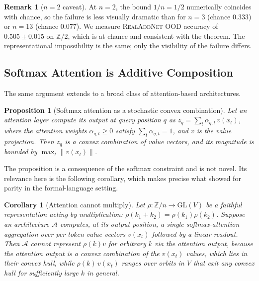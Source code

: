 \documentclass[11pt]{article}
\newtheorem{proposition}[theorem]{Proposition}
\newtheorem{corollary}[theorem]{Corollary}
\theoremstyle{definition}
\newtheorem{remark}[theorem]{Remark}
\newcommand{\Z}{\mathbb{Z}}
\begin{document}
\begin{remark}[$n=2$ caveat]
\label{rem:n-equals-2}
At $n=2$, the bound $1/n = 1/2$ numerically coincides with chance,
so the failure is less visually dramatic than for $n=3$ (chance
$0.333$) or $n=13$ (chance $0.077$). We measure
\textsc{RealAddNet} OOD accuracy of $0.505 \pm 0.015$ on $\Z/2$,
which is at chance and consistent with the theorem. The
representational impossibility is the same; only the visibility
of the failure differs.
\end{remark}

\subsection{Softmax Attention is Additive Composition}
\label{subsec:attention-additive}

The same argument extends to a broad class of attention-based
architectures.

\begin{proposition}[Softmax attention as a stochastic convex combination]
\label{prop:attention-additive}
Let an attention layer compute its output at query position $q$ as
$z_q = \sum_{t} \alpha_{q,t} \, v(x_t)$, where the attention weights
$\alpha_{q,t} \geq 0$ satisfy $\sum_t \alpha_{q,t} = 1$, and $v$ is
the value projection. Then $z_q$ is a convex combination of value
vectors, and its magnitude is bounded by $\max_t \|v(x_t)\|$.
\end{proposition}

The proposition is a consequence of the softmax constraint and is
not novel. Its relevance here is the following corollary, which
makes precise what \citet{hahn2020theoretical} showed for parity in
the formal-language setting.

\begin{corollary}[Attention cannot multiply]
\label{cor:attention-cant-multiply}
Let $\rho: \Z/n \to \mathrm{GL}(V)$ be a faithful representation
acting by multiplication: $\rho(k_1+k_2) = \rho(k_1)\rho(k_2)$.
Suppose an architecture $\mathcal{A}$ computes, at its output
position, a single softmax-attention aggregation over per-token
value vectors $v(x_t)$ followed by a linear readout. Then $\mathcal{A}$
cannot represent $\rho(k) v$ for arbitrary $k$ via the attention
output, because the attention output is a convex combination of the
$v(x_t)$ values, which lies in their convex hull, while
$\rho(k)\, v(x_t)$ ranges over orbits in $V$ that exit any convex
hull for sufficiently large $k$ in general.
\end{corollary}
\end{document}
